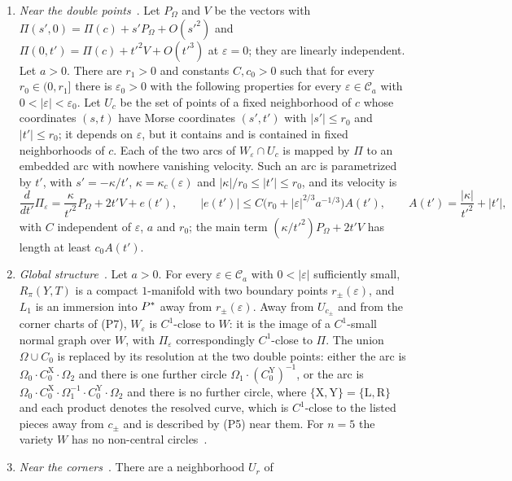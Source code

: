 \begin{enumerate}
\item[(P5)] \emph{Near the double points}~\cite[Lemma~5.6 and its proof]{WuebbenV}. Let $P_\Omega$ and $V$ be the vectors
with $\Pi(s',0)=\Pi(c)+s'P_\Omega+O(s'^2)$ and $\Pi(0,t')=\Pi(c)+t'^2V+O(t'^3)$ at $\varepsilon=0$; they are linearly
independent. Let $a>0$. There are $r_1>0$ and constants $C,c_0>0$ such that for every $r_0\in(0,r_1]$ there is $\varepsilon_0>0$ with the following properties for every $\varepsilon\in\mathcal C_a$ with $0<|\varepsilon|<\varepsilon_0$. Let $U_c$ be the set of points of a fixed neighborhood of $c$
whose coordinates $(s,t)$ have Morse coordinates $(s',t')$ with $|s'|\le r_0$ and $|t'|\le r_0$; it depends on
$\varepsilon$, but it contains and is contained in fixed neighborhoods of $c$. Each of the two arcs of $W_\varepsilon\cap U_c$
is mapped by $\Pi$ to an embedded arc with nowhere vanishing velocity. Such an arc is parametrized by $t'$, with
$s'=-\kappa/t'$, $\kappa=\kappa_c(\varepsilon)$ and $|\kappa|/r_0\le|t'|\le r_0$, and its velocity is
\[
\frac{d}{dt'}\Pi_\varepsilon=\frac{\kappa}{t'^2}P_\Omega+2t'V+e(t'),\qquad
|e(t')|\le C\bigl(r_0+|\varepsilon|^{2/3}a^{-1/3}\bigr)A(t'),\qquad A(t')=\frac{|\kappa|}{t'^2}+|t'|,
\]
with $C$ independent of $\varepsilon$, $a$ and $r_0$; the main term $(\kappa/t'^2)P_\Omega+2t'V$ has length at least $c_0A(t')$.
\item[(P6)] \emph{Global structure}~\cite[Prop.~5.7(1), (2), (4)]{WuebbenV}. Let $a>0$. For every
$\varepsilon\in\mathcal C_a$ with $0<|\varepsilon|$ sufficiently small, $R_\pi(Y,T)$ is a compact $1$-manifold with two
boundary points $r_\pm(\varepsilon)$, and $L_1$ is an immersion into $P^{*}$ away from $r_\pm(\varepsilon)$. Away from
$U_{c_\pm}$ and from the corner charts of (P7), $W_\varepsilon$ is $C^1$-close to $W$: it is the image of a $C^1$-small
normal graph over $W$, with $\Pi_\varepsilon$ correspondingly $C^1$-close to $\Pi$. The union $\Omega\cup C_0$ is replaced by its
resolution at the two double points: either the arc is $\Omega_0\cdot C_0^{\mathrm X}\cdot\Omega_2$ and there is one further
circle $\Omega_1\cdot(C_0^{\mathrm Y})^{-1}$, or the arc is $\Omega_0\cdot C_0^{\mathrm X}\cdot\Omega_1^{-1}\cdot C_0^{\mathrm Y}\cdot\Omega_2$
and there is no further circle, where $\{\mathrm X,\mathrm Y\}=\{\mathrm L,\mathrm R\}$ and each product denotes the
resolved curve, which is $C^1$-close to the listed pieces away from $c_\pm$ and is described by (P5) near them. For
$n=5$ the variety $W$ has no non-central circles~\cite[Prop.~3.6]{WuebbenV}.
\item[(P7)] \emph{Near the corners}~\cite[Lemma~5.1 and Cor.~5.3]{WuebbenV}. There are a neighborhood $U_r$ of

\end{enumerate}
